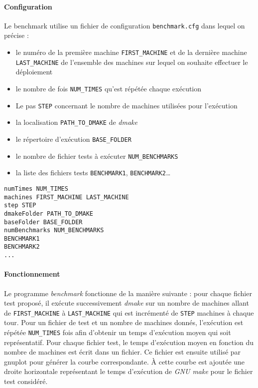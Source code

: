 \documentclass[a4paper,12pt,twoside]{article}
\begin{document}
\paragraph{Configuration}
Le benchmark utilise un fichier de configuration
\texttt{benchmark.cfg} dans lequel on précise : 
\begin{itemize}
\item  le numéro de la première machine \texttt{FIRST\_MACHINE}
et de la dernière machine \texttt{LAST\_MACHINE} de l'ensemble des machines 
sur lequel on souhaite effectuer le déploiement
\item le nombre de fois
\texttt{NUM\_TIMES} qu'est répétée chaque exécution
\item Le pas \texttt{STEP} concernant le nombre de machines utilisées
  pour l'exécution
\item la localisation \texttt{PATH\_TO\_DMAKE} de \emph{dmake}
\item le répertoire d'exécution \texttt{BASE\_FOLDER}
\item le nombre de fichier tests à exécuter \texttt{NUM\_BENCHMARKS}
\item la liste des fichiers tests \texttt{BENCHMARK1}, \texttt{BENCHMARK2}\dots
\end{itemize}

\begin{verbatim}
numTimes NUM_TIMES
machines FIRST_MACHINE LAST_MACHINE
step STEP
dmakeFolder PATH_TO_DMAKE
baseFolder BASE_FOLDER
numBenchmarks NUM_BENCHMARKS
BENCHMARK1
BENCHMARK2
...
\end{verbatim}

\paragraph{Fonctionnement}

Le programme \emph{benchmark} fonctionne de la manière suivante : pour
chaque fichier test proposé, il exécute successivement \emph{dmake} sur un nombre de
machines allant de \texttt{FIRST\_MACHINE} à \texttt{LAST\_MACHINE}
qui est incrémenté de \texttt{STEP} machines à chaque tour. Pour un
fichier de test et un nombre de machines donnés, l'exécution est
répétée \texttt{NUM\_TIMES} fois afin d'obtenir un temps d'exécution moyen
qui soit représentatif. 
Pour chaque fichier test, le temps d'exécution moyen en fonction du
nombre de machines est écrit dans un fichier. Ce fichier est ensuite
utilisé par gnuplot pour générer la courbe correspondante. À cette
courbe est ajoutée une droite horizontale représentant le temps
d'exécution de \emph{GNU make} pour le fichier test considéré. 
\end{document}
